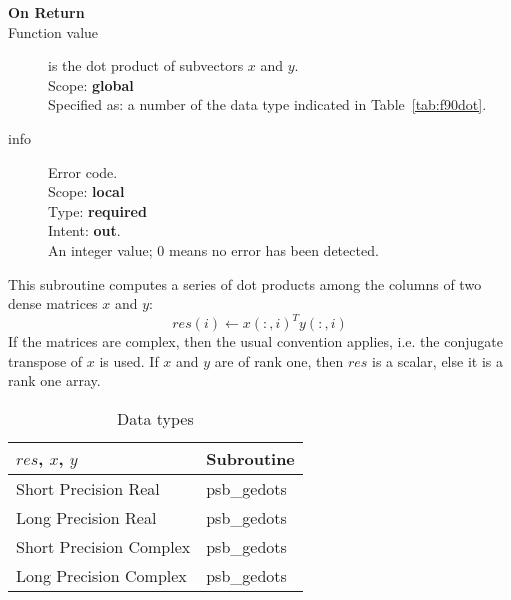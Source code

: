 \begin{description}
\item[\bf On Return] 
\item[Function value] is the dot product of subvectors $x$ and $y$.\\
Scope: {\bf global} \\
Specified as: a number of the data type indicated in Table~\ref{tab:f90dot}.
\item[info] Error code.\\
Scope: {\bf local} \\
Type: {\bf required} \\
Intent: {\bf out}.\\
An integer value; 0 means no error has been detected. 
\end{description}
%
%


This subroutine computes a series of  dot products among the columns of
two dense matrices  $x$ and $y$: 
\[ res(i) \leftarrow x(:,i)^T y(:,i)\]
If the matrices are complex, then the
usual convention applies, i.e. the conjugate transpose of $x$ is
used. If $x$ and $y$ are of rank one, then $res$ is a scalar, else it
is a rank one array. 

\begin{table}[h]
\begin{center}
\begin{tabular}{ll}
\hline
$res$, $x$, $y$ & {\bf Subroutine}\\
\hline
Short Precision Real & psb\_gedots \\
Long Precision Real & psb\_gedots \\
Short Precision Complex & psb\_gedots \\	
Long Precision Complex & psb\_gedots \\	
\hline
\end{tabular}
\end{center}
\caption{Data types\label{tab:f90mdot}}
\end{table}

